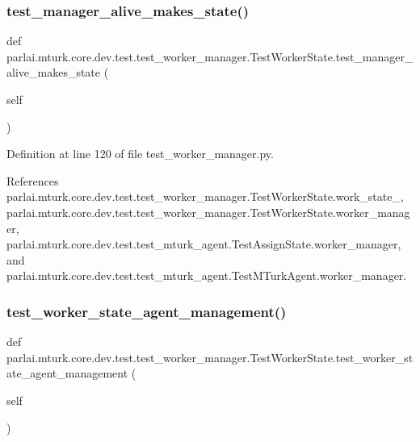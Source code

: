 \subsubsection{\texorpdfstring{test\+\_\+manager\+\_\+alive\+\_\+makes\+\_\+state()}{test\_manager\_alive\_makes\_state()}}
{\footnotesize\ttfamily def parlai.\+mturk.\+core.\+dev.\+test.\+test\+\_\+worker\+\_\+manager.\+Test\+Worker\+State.\+test\+\_\+manager\+\_\+alive\+\_\+makes\+\_\+state (\begin{DoxyParamCaption}\item[{}]{self }\end{DoxyParamCaption})}



Definition at line 120 of file test\+\_\+worker\+\_\+manager.\+py.



References parlai.\+mturk.\+core.\+dev.\+test.\+test\+\_\+worker\+\_\+manager.\+Test\+Worker\+State.\+work\+\_\+state\+\_, parlai.\+mturk.\+core.\+dev.\+test.\+test\+\_\+worker\+\_\+manager.\+Test\+Worker\+State.\+worker\+\_\+manager, parlai.\+mturk.\+core.\+dev.\+test.\+test\+\_\+mturk\+\_\+agent.\+Test\+Assign\+State.\+worker\+\_\+manager, and parlai.\+mturk.\+core.\+dev.\+test.\+test\+\_\+mturk\+\_\+agent.\+Test\+M\+Turk\+Agent.\+worker\+\_\+manager.

\mbox{\label{classparlai_1_1mturk_1_1core_1_1dev_1_1test_1_1test__worker__manager_1_1TestWorkerState_af846b12c568c82ed66282317397a772c}} 
\subsubsection{\texorpdfstring{test\+\_\+worker\+\_\+state\+\_\+agent\+\_\+management()}{test\_worker\_state\_agent\_management()}}
{\footnotesize\ttfamily def parlai.\+mturk.\+core.\+dev.\+test.\+test\+\_\+worker\+\_\+manager.\+Test\+Worker\+State.\+test\+\_\+worker\+\_\+state\+\_\+agent\+\_\+management (\begin{DoxyParamCaption}\item[{}]{self }\end{DoxyParamCaption})}

